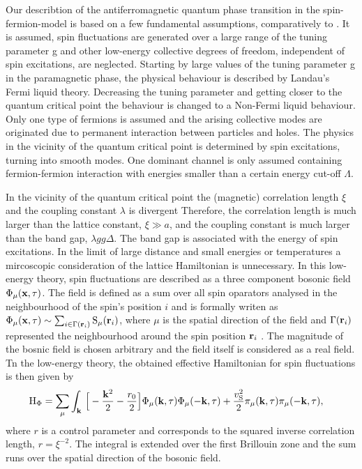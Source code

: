 Our describtion of the antiferromagnetic quantum phase transition in the spin-fermion-model is based on a few fundamental assumptions, comparatively to \cite{Abanov&Chubukov&Schmalian}.
It is assumed, spin fluctuations are generated over a large range of the tuning parameter g and other low-energy collective degrees of freedom, independent of spin excitations, are neglected.
Starting by large values of the tuning parameter g in the paramagnetic phase, the physical behaviour is described by Landau's Fermi liquid theory.
Decreasing the tuning parameter and getting closer to the quantum critical point the behaviour is changed to a Non-Fermi liquid behaviour.
Only one type of fermions is assumed and the arising collective modes are originated due to permanent interaction between particles and holes.
The physics in the vicinity of the quantum critical point is determined by spin excitations, turning into smooth modes.
One dominant channel is only assumed containing fermion-fermion interaction with energies smaller than a certain energy cut-off $\Lambda$.

In the vicinity of the quantum critical point the (magnetic) correlation length $\xi$ and the coupling constant $\lambda$ is divergent
Therefore, the correlation length is much larger than the lattice constant, $\xi \gg a$, and the coupling constant is much larger than the band gap, $\lambda gg \Delta$. 
The band gap is associated with the energy of spin excitations.
In the limit of large distance and small energies or temperatures a mircoscopic consideration of the lattice Hamiltonian is unnecessary.
In this low-energy theory, spin fluctuations are described as a three component bosonic field $\Phi_{\mu}(\vb{x}, \tau)$.
The field is defined as a sum over all spin oparators analysed in the neighbourhood of the spin's position $i$ and is formally writen as $\Phi_{\mu}(\vb{x}, \tau) \sim \sum_{i \in \Gamma(\vb{r}_{i})} \mathrm{S}_{\mu}(\vb{r}_{i})$, where $\mu$ is the spatial direction of the field and $\Gamma(\vb{r}_{i})$ represented the neighbourhood around the spin position $\vb{r}_{i}$ \cite{SachdevQCP}.
The magnitude of the bosnic field is chosen arbitrary and the field itself is considered as a real field.
Tn the low-energy theory, the obtained effective Hamiltonian for spin fluctuations is then given by
%
\begin{align}
	\mathrm{H}_{\Phi} &= 
	 	\sum\limits_{\mu} \int_{\vb{k}}\, \Big[
	 	-\frac{\vb{k}^{2}}{2} - \frac{r_{0}}{2}\Big] \Phi_{\mu}(\vb{k},\tau) \Phi_{\mu}(-\vb{k},\tau)
		+
		\frac{v_{\mathrm{S}}^{2}}{2} \pi_{\mu}(\vb{k},\tau) \pi_{\mu}(-\vb{k},\tau),
	\label{eq:Hamiltonian spin fluctuation}
\end{align}
%
where $r$ is a control parameter and corresponds to the squared inverse correlation length, $r = \xi^{-2}$.
The integral is extended over the first Brillouin zone and the sum runs over the spatial direction of the bosonic field.

